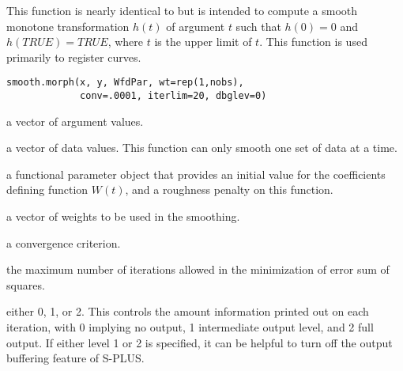 \documentclass{article}
\begin{document}
\begin{Description}\relax
This function is nearly identical to  but is
intended to compute a smooth monotone transformation $h(t)$ of
argument $t$ such that $h(0) = 0$ and $h(TRUE) = TRUE$, where $t$ is
the upper limit of $t$.  This function is used primarily to register
curves.
\end{Description}
\begin{Usage}
\begin{verbatim}
smooth.morph(x, y, WfdPar, wt=rep(1,nobs),
             conv=.0001, iterlim=20, dbglev=0)
\end{verbatim}
\end{Usage}
\begin{Arguments}
\begin{ldescription}
\item[\code{x}] a vector of argument values.

\item[\code{y}] a vector of data values.  This function can only smooth one set of
data at a time.

\item[\code{WfdPar}] a functional parameter object that provides an initial value for the
coefficients defining function $W(t)$, and a roughness penalty on
this function.

\item[\code{wt}] a vector of weights to be used in the smoothing.

\item[\code{conv}] a convergence criterion.

\item[\code{iterlim}] the maximum number of iterations allowed in the minimization of
error sum of squares.

\item[\code{dbglev}] either 0, 1, or 2.  This controls the amount information printed out
on each iteration, with 0 implying no output, 1 intermediate output
level, and 2 full output.  If either level 1 or 2 is specified, it
can be helpful to turn off the output buffering feature of S-PLUS.

\end{ldescription}
\end{Arguments}
\end{document}
